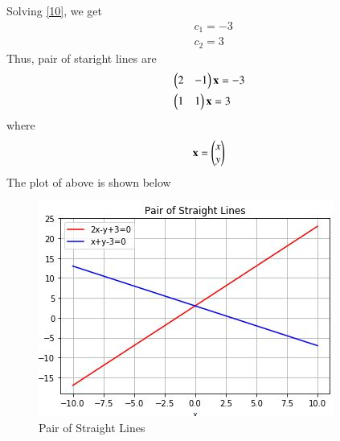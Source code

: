 \documentclass[journal,12pt,twocolumn]{IEEEtran}
\begin{document}
Solving \eqref{10}, we get
\begin{align}
	&c_1 = -3 \\
	&c_2 = 3
\end{align}
Thus, pair of staright lines are
\begin{align}
& \begin{pmatrix}2 &-1\end{pmatrix}\mathbf{x} = -3 \\
& \begin{pmatrix}1 &1\end{pmatrix}\mathbf{x} = 3 
\end{align}
where
\begin{align}
\mathbf{x} = \begin{pmatrix}x \\ y\end{pmatrix}	
\end{align}
The plot of above is shown below 
\begin{figure}[!htb]
	
	\centering
	
	\includegraphics[width=\columnwidth]{assignment4fig.jpg}
	
	\caption{Pair of Straight Lines}
	
	\label{fig:1}
	
\end{figure}
\end{document}

